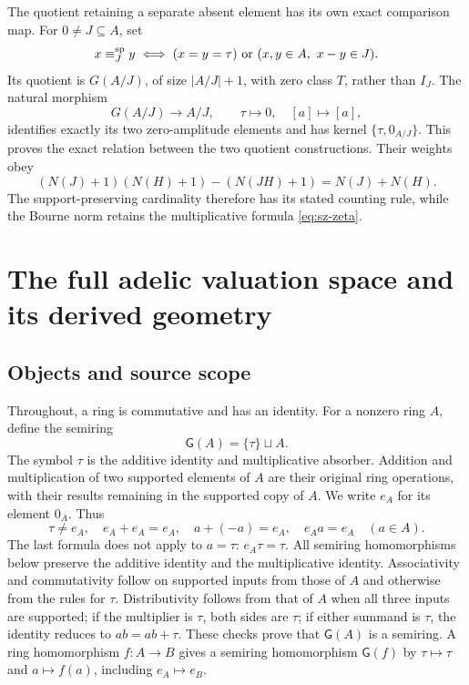 \documentclass[11pt,a4paper]{article}
\theoremstyle{definition}\newtheorem{definition}[theorem]{Definition}
\newcommand{\G}{\mathsf G}\newcommand{\Tor}{\operatorname{Tor}}\newcommand{\Frac}{\operatorname{Frac}}
\begin{document}
The quotient retaining a separate absent element has its own exact
comparison map. For \(0\ne J\subseteq A\), set
\[
 x\equiv_J^{\rm sp}y
 \iff (x=y=\tau)\ \text{or}\ (x,y\in A,\ x-y\in J).
\]
Its quotient is \(G(A/J)\), of size \(|A/J|+1\), with zero class
\(T\), rather than \(I_J\). The natural morphism
\[
 G(A/J)\longrightarrow A/J,\qquad
 \tau\mapsto0,\quad[a]\mapsto[a],
\]
identifies exactly its two zero-amplitude elements and has kernel
\(\{\tau,0_{A/J}\}\). This proves the exact relation between the
two quotient constructions. Their weights obey
\[
 (N(J)+1)(N(H)+1)-(N(JH)+1)=N(J)+N(H).
\]
The support-preserving cardinality therefore has its stated counting
rule, while the Bourne norm retains the multiplicative formula
\eqref{eq:sz-zeta}.

\section{The full adelic valuation space and its derived geometry}


\subsection{Objects and source scope}

Throughout, a ring is commutative and has an identity. For a nonzero ring
$A$, define the semiring
\[
 \G(A)=\{\tau\}\sqcup A.
\]
The symbol $\tau$ is the additive identity and multiplicative absorber.
Addition and multiplication of two supported elements of $A$ are their
original ring operations, with their results remaining in the supported
copy of $A$. We write $e_A$ for its element $0_A$. Thus
\[
 \tau\ne e_A,\quad e_A+e_A=e_A,\quad
 a+(-a)=e_A,\quad e_Aa=e_A\quad(a\in A).
 \tag{AV1.1}\label{eq:split-identities}
\]
The last formula does not apply to $a=\tau$: $e_A\tau=\tau$.
All semiring homomorphisms below preserve the additive identity and the
multiplicative identity. Associativity and commutativity follow on supported
inputs from those of $A$ and otherwise from the rules for $\tau$.
Distributivity follows from that of $A$ when all three inputs are supported;
if the multiplier is $\tau$, both sides are $\tau$; if either summand is
$\tau$, the identity reduces to $a b=a b+\tau$. These checks prove that
$\G(A)$ is a semiring. A ring homomorphism $f:A\to B$ gives a semiring
homomorphism $\G(f)$ by $\tau\mapsto\tau$ and $a\mapsto f(a)$, including
$e_A\mapsto e_B$.
\end{document}
